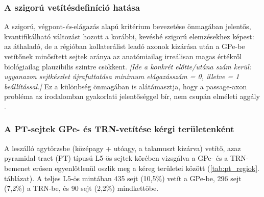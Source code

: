 \subsubsection{A szigorú vetítésdefiníció hatása}

A szigorú, végpont-\emph{és}-elágazás alapú kritérium bevezetése önmagában
jelentős, kvantifikálható változást hozott a korábbi, kevésbé szigorú
elemzésekhez képest: az áthaladó, de a régióban kollaterálist leadó axonok
kizárása után a GPe-be vetítőnek minősített sejtek aránya az anatómiailag
irreálisan magas értékről biológiailag plauzibilis szintre csökkent.
\emph{[Ide a konkrét előtte/utána szám kerül: ugyanazon sejtkészlet
újrafuttatása minimum elágazásszám = 0, illetve = 1 beállítással.]}
Ez a különbség önmagában is alátámasztja, hogy a passage-axon probléma az
irodalomban gyakorlati jelentőséggel bír, nem csupán elméleti aggály
\cite{hunnicutt2016}.

\subsubsection{A PT-sejtek GPe- és TRN-vetítése kérgi területenként}

A leszálló agytörzsbe (középagy + utóagy, a talamuszt kizárva) vetítő, azaz
pyramidal tract (PT) típusú L5-ös sejtek körében vizsgálva a GPe- és a
TRN-bemenet erősen egyenlőtlenül oszlik meg a kéreg területei között
(\ref{tab:pt_regiok}. táblázat). A teljes L5-ös mintában 435 sejt (10,5\%)
vetít a GPe-be, 296 sejt (7,2\%) a TRN-be, és 90 sejt (2,2\%) mindkettőbe.

